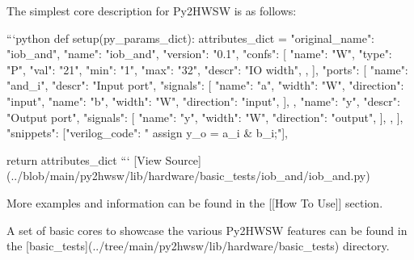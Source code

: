 The simplest core description for Py2HWSW is as follows:

```python
def setup(py_params_dict):
    attributes_dict = {
        "original_name": "iob_and",
        "name": "iob_and",
        "version": "0.1",
        "confs": [
            {
                "name": "W",
                "type": "P",
                "val": "21",
                "min": "1",
                "max": "32",
                "descr": "IO width",
            },
        ],
        "ports": [
            {
                "name": "and_i",
                "descr": "Input port",
                "signals": [
                    {"name": "a", "width": "W", "direction": "input"},
                    {"name": "b", "width": "W", "direction": "input"},
                ],
            },
            {
                "name": "y",
                "descr": "Output port",
                "signals": [
                    {"name": "y", "width": "W", "direction": "output"},
                ],
            },
        ],
        "snippets": [{"verilog_code": "   assign y_o = a_i & b_i;"}],
    }

    return attributes_dict
```
[View Source](../blob/main/py2hwsw/lib/hardware/basic_tests/iob_and/iob_and.py)

More examples and information can be found in the [[How To Use]] section.

A set of basic cores to showcase the various Py2HWSW features can be found in the [basic_tests](../tree/main/py2hwsw/lib/hardware/basic_tests) directory.

